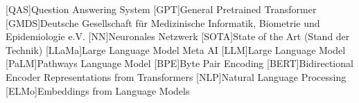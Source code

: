 \begin{acronym}[SPARQL]
    [QAS]{Question Answering System}
    [GPT]{General Pretrained Transformer}
    [GMDS]{Deutsche Gesellschaft für Medizinische Informatik, Biometrie und Epidemiologie e.V.}
    [NN]{Neuronales Netzwerk}
    [SOTA]{State of the Art (Stand der Technik)}
    [LLaMa]{Large Language Model Meta AI}
    [LLM]{Large Language Model}
    [PaLM]{Pathways Language Model}
    [BPE]{Byte Pair Encoding}
    [BERT]{Bidirectional Encoder Representations from Transformers}
    [NLP]{Natural Language Processing}
    [ELMo]{Embeddings from Language Models}
\end{acronym}
